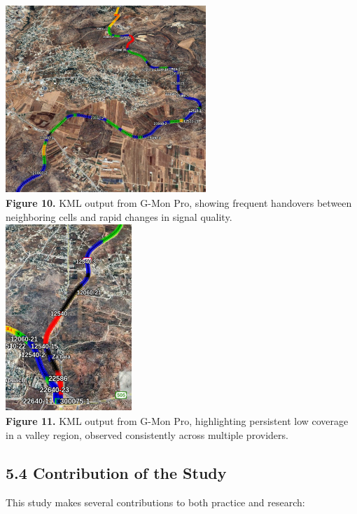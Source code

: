 \documentclass[11pt]{article}
\begin{document}
\includegraphics[width=2.98125in,height=2.7956in]{figures/media/image10.png}\\
\textbf{Figure 10.} KML output from G-Mon Pro, showing frequent handovers
between neighboring cells and rapid changes in signal quality.\\
\includegraphics[width=1.87708in,height=2.78502in]{figures/media/image4.png}\\
\textbf{Figure 11.} KML output from G-Mon Pro, highlighting persistent
low coverage in a valley region, observed consistently across multiple
providers.

\hypertarget{contribution-of-the-study}{%
\subsection{5.4 Contribution of the
Study}\label{contribution-of-the-study}}

This study makes several contributions to both practice and research:
\end{document}
